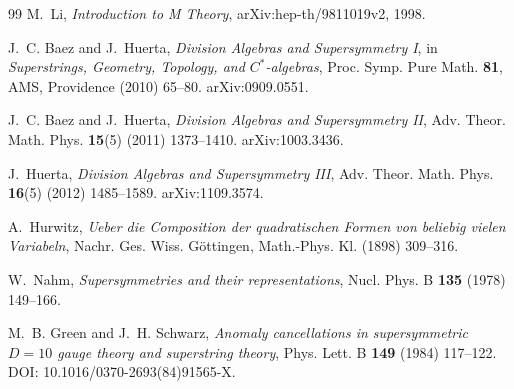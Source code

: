 \documentclass[11pt,a4paper]{article}
\theoremstyle{definition}
\theoremstyle{remark}
\begin{document}
\begin{thebibliography}{99}
M.~Li,
\emph{Introduction to M Theory},
arXiv:hep-th/9811019v2, 1998.

J.~C. Baez and J.~Huerta,
\emph{Division Algebras and Supersymmetry I},
in \emph{Superstrings, Geometry, Topology, and $C^{*}$-algebras},
Proc. Symp. Pure Math. {\bf 81}, AMS, Providence (2010) 65--80.
arXiv:0909.0551.

J.~C. Baez and J.~Huerta,
\emph{Division Algebras and Supersymmetry II},
Adv. Theor. Math. Phys. {\bf 15}(5) (2011) 1373--1410.
arXiv:1003.3436.

J.~Huerta,
\emph{Division Algebras and Supersymmetry III},
Adv. Theor. Math. Phys. {\bf 16}(5) (2012) 1485--1589.
arXiv:1109.3574.

A.~Hurwitz,
\emph{Ueber die Composition der quadratischen Formen von beliebig vielen Variabeln},
Nachr. Ges. Wiss. G\"ottingen, Math.-Phys. Kl. (1898) 309--316.

W.~Nahm,
\emph{Supersymmetries and their representations},
Nucl. Phys. B {\bf 135} (1978) 149--166.

M.~B. Green and J.~H. Schwarz,
\emph{Anomaly cancellations in supersymmetric $D = 10$ gauge theory and superstring theory},
Phys. Lett. B {\bf 149} (1984) 117--122.
DOI: 10.1016/0370-2693(84)91565-X.

\end{thebibliography}
\end{document}
